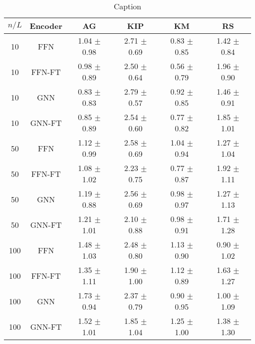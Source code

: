 \begin{table*}[]
	\centering
	{\small
	\begin{tabular}{cccccc}
		\toprule
		\textbf{$n/L$} & \textbf{Encoder} & \textbf{AG} & \textbf{KIP} & \textbf{KM} & \textbf{RS}\\ \midrule
		10 & FFN & 1.04 $\pm$ 0.98 & 2.71 $\pm$ 0.69 & 0.83 $\pm$ 0.85 & 1.42 $\pm$ 0.84\\
		10 & FFN-FT & 0.98 $\pm$ 0.89 & 2.50 $\pm$ 0.64 & 0.56 $\pm$ 0.79 & 1.96 $\pm$ 0.90\\
		10 & GNN & 0.83 $\pm$ 0.83 & 2.79 $\pm$ 0.57 & 0.92 $\pm$ 0.85 & 1.46 $\pm$ 0.91\\
		10 & GNN-FT & 0.85 $\pm$ 0.89 & 2.54 $\pm$ 0.60 & 0.77 $\pm$ 0.82 & 1.85 $\pm$ 1.01\\
		50 & FFN & 1.12 $\pm$ 0.99 & 2.58 $\pm$ 0.69 & 1.04 $\pm$ 0.94 & 1.27 $\pm$ 1.04\\
		50 & FFN-FT & 1.08 $\pm$ 1.02 & 2.23 $\pm$ 0.75 & 0.77 $\pm$ 0.87 & 1.92 $\pm$ 1.11\\
		50 & GNN & 1.19 $\pm$ 0.88 & 2.56 $\pm$ 0.69 & 0.98 $\pm$ 0.97 & 1.27 $\pm$ 1.13\\
		50 & GNN-FT & 1.21 $\pm$ 1.01 & 2.10 $\pm$ 0.88 & 0.98 $\pm$ 0.91 & 1.71 $\pm$ 1.28\\
		100 & FFN & 1.48 $\pm$ 1.03 & 2.48 $\pm$ 0.80 & 1.13 $\pm$ 0.90 & 0.90 $\pm$ 1.02\\
		100 & FFN-FT & 1.35 $\pm$ 1.11 & 1.90 $\pm$ 1.00 & 1.12 $\pm$ 0.89 & 1.63 $\pm$ 1.27\\
		100 & GNN & 1.73 $\pm$ 0.94 & 2.37 $\pm$ 0.79 & 0.90 $\pm$ 0.95 & 1.00 $\pm$ 1.09\\
		100 & GNN-FT & 1.52 $\pm$ 1.01 & 1.85 $\pm$ 1.04 & 1.25 $\pm$ 1.00 & 1.38 $\pm$ 1.30\\
		\bottomrule
	\end{tabular}
	}
	\caption{Caption}
	\label{my_label}
\end{table*}
